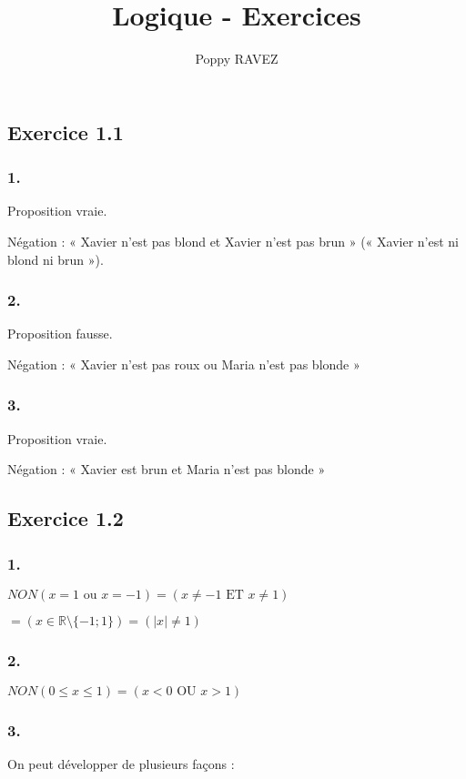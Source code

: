 \documentclass[a4paper,10pt]{report}
\title{Logique - Exercices}
\author{Poppy RAVEZ}
\begin{document}
	
	
\subsection*{Exercice 1.1}

\subsubsection*{1.}

Proposition vraie.

Négation : « Xavier n'est pas blond et Xavier n'est pas brun » (« Xavier n'est ni blond ni brun »).

\subsubsection*{2.}

Proposition fausse.

Négation : « Xavier n'est pas roux ou Maria n'est pas blonde »

\subsubsection*{3.}

Proposition vraie.

Négation : « Xavier est brun et Maria n'est pas blonde »


\subsection*{Exercice 1.2}

\subsubsection*{1.}

$NON(x=1 \text{ ou } x=-1) = (x \neq -1 \text{ ET } x \neq 1)$

$= (x \in \mathbb{R}\setminus\{-1;1\}) = (|x|\neq 1)$

\subsubsection*{2.}

$NON(0 \leq x \leq 1) = (x<0 \text{ OU } x>1) $

\subsubsection*{3.}
On peut développer de plusieurs façons :
\end{document}
